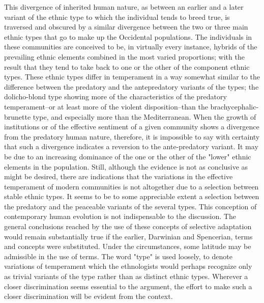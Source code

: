 \documentclass[12pt]{report}
\begin{document}
This divergence of inherited human nature, as between an earlier and a
later variant of the ethnic type to which the individual tends to breed
true, is traversed and obscured by a similar divergence between the
two or three main ethnic types that go to make up the Occidental
populations. The individuals in these communities are conceived to be,
in virtually every instance, hybrids of the prevailing ethnic elements
combined in the most varied proportions; with the result that they tend
to take back to one or the other of the component ethnic types. These
ethnic types differ in temperament in a way somewhat similar to the
difference between the predatory and the antepredatory variants of the
types; the dolicho-blond type showing more of the characteristics of the
predatory temperament--or at least more of the violent disposition--than
the brachycephalic-brunette type, and especially more than the
Mediterranean. When the growth of institutions or of the effective
sentiment of a given community shows a divergence from the predatory
human nature, therefore, it is impossible to say with certainty that
such a divergence indicates a reversion to the ante-predatory variant.
It may be due to an increasing dominance of the one or the other of the
"lower" ethnic elements in the population. Still, although the evidence
is not as conclusive as might be desired, there are indications that
the variations in the effective temperament of modern communities is not
altogether due to a selection between stable ethnic types. It seems to
be to some appreciable extent a selection between the predatory and the
peaceable variants of the several types. This conception of contemporary
human evolution is not indispensable to the discussion. The general
conclusions reached by the use of these concepts of selective
adaptation would remain substantially true if the earlier, Darwinian
and Spencerian, terms and concepts were substituted. Under the
circumstances, some latitude may be admissible in the use of terms. The
word "type" is used loosely, to denote variations of temperament which
the ethnologists would perhaps recognize only as trivial variants of
the type rather than as distinct ethnic types. Wherever a closer
discrimination seems essential to the argument, the effort to make such
a closer discrimination will be evident from the context.
\end{document}
